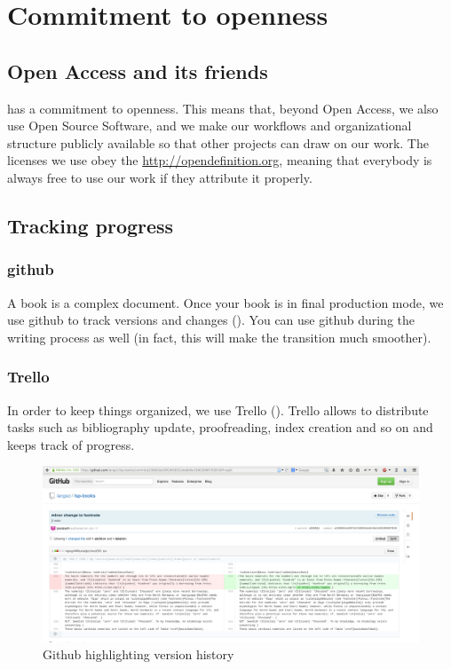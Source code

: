 \chapter{Commitment to openness}
\section{Open Access and its friends}
\lsp has a commitment to openness. This means that, beyond Open Access, we also use Open Source Software, and we make our workflows and organizational structure publicly available so that other projects can draw on our work. The licenses we use obey the \href{Open Definition}{http://opendefinition.org}, meaning that everybody is always free to use our work if they attribute it properly.




\section{Tracking progress}
\subsection{github}
A book is a complex document. Once your book is in final production mode, we use github to track versions and changes (). You can use github during the writing process as well (in fact, this will make the transition much smoother).

\subsection{Trello}
In order to keep things organized, we use Trello (). Trello allows to distribute tasks such as bibliography update, proofreading, index creation and so on and keeps track of progress.

\begin{figure}
\caption{Github highlighting version history}
\label{fig:latex:github}
 \includegraphics[width=\textwidth]{github.png}
\end{figure}

